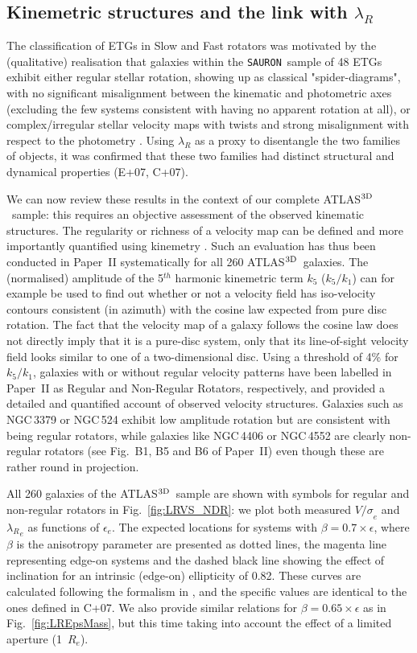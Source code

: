 \documentclass[useAMS,usenatbib,usegraphicx]{mn2e}
\newcommand{\Sauron}{\texttt{SAURON}}
\newcommand{\atlas}{{ATLAS$^{\rm 3D}$}}
\begin{document}
\subsection{Kinemetric structures and the link with $\lambda_R$}

The classification of ETGs in Slow and Fast rotators was motivated by the
(qualitative) realisation that galaxies within the \Sauron\ sample of 48 ETGs
\citep{deZeeuw+02} exhibit either regular stellar rotation, showing up as
classical "spider-diagrams", with no significant misalignment between the kinematic 
and photometric axes (excluding the few systems consistent with having no apparent rotation at
all), or complex/irregular stellar velocity maps with twists
and strong misalignment with respect to the photometry \citep{Emsellem+04, PaperXII}. Using $\lambda_R$ as a
proxy to disentangle the two families of objects, it was confirmed that these
two families had distinct structural and dynamical properties (E+07, C+07).

We can now review these results in the context of our complete \atlas\ sample:
this requires an objective assessment of the observed kinematic structures.
The regularity or richness of a velocity map can be defined and more importantly
quantified using kinemetry \citep{Krajnovic+06}. Such an evaluation has thus
been conducted in Paper~II systematically for all 260 \atlas\ galaxies.
The (normalised) amplitude of the 5$^{th}$ harmonic kinemetric term $k_5$ ($k_5/k_1$)
can for example be used to find out whether or not a velocity field has
iso-velocity contours consistent (in azimuth) with the cosine law expected from pure disc
rotation. The fact that the velocity map of a galaxy follows the cosine law does not
directly imply that it is a pure-disc system, only that its line-of-sight velocity
field looks similar to one of a two-dimensional disc. 
Using a threshold of 4\% for $k_5/k_1$, galaxies with 
or without regular velocity patterns have been labelled in Paper~II 
as Regular and Non-Regular Rotators, respectively, and provided a
detailed and quantified account of observed velocity structures.
Galaxies such as NGC\,3379 or NGC\,524 exhibit low amplitude rotation but are consistent with being regular rotators, 
while galaxies like NGC\,4406 or NGC\,4552 are clearly non-regular rotators (see Fig.~B1, B5 and B6 of
Paper~II) even though these are rather round in projection.  

All 260 galaxies of the \atlas\ sample are shown with symbols for regular and
non-regular rotators in Fig.~\ref{fig:LRVS_NDR}: we plot both measured ${V/\sigma}_e$
and ${\lambda_R}_e$ as functions of ${\epsilon}_e$. The expected locations
for systems with $\beta = 0.7 \times \epsilon$, where $\beta$ is the anisotropy
parameter are presented as dotted lines, the magenta line representing edge-on
systems and the dashed black line showing the effect of inclination for an
intrinsic (edge-on) ellipticity of 0.82. These curves are calculated following the
formalism in \cite{Binney05}, and the specific values are identical to the ones 
defined in C+07. We also provide similar relations for $\beta = 0.65 \times \epsilon$
as in Fig.~\ref{fig:LREpsMass}, but this time taking into account the effect of a limited
aperture (1~$R_e$). 
\end{document}
